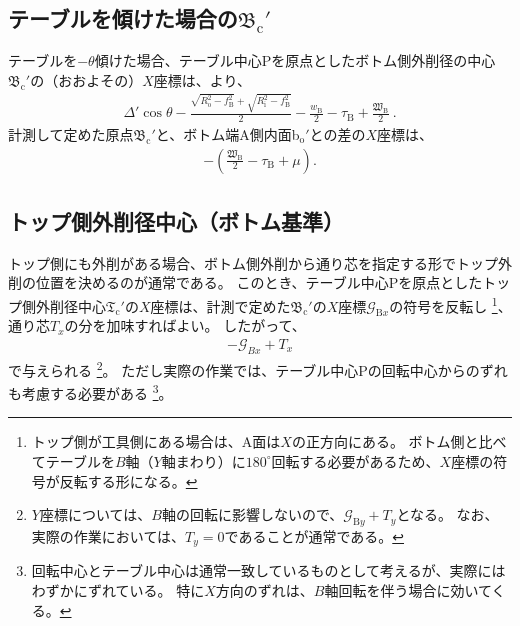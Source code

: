 \subsection[テーブルを傾けた場合の\texorpdfstring{$\mathfrak B_\mathrm c'$}{Bc'}]
           {テーブルを傾けた場合の$\boldsymbol{\mathfrak B_\mathrm c'}$}
テーブルを$-\theta$傾けた場合、テーブル中心Pを原点としたボトム側外削径の中心$\mathfrak B_\mathrm c'$の（おおよその）$X$座標は、より、
\begin{align*}
  \varDelta'\cos\theta-\frac{\sqrt{R_\mathrm o^2-f_\mathrm B^2}+\sqrt{R_\mathrm i^2-f_\mathrm B^2}}2
  -\frac{w_\mathrm B}2-\tau_\mathrm B+\frac{\mathfrak W_\mathrm B}2\ .
\end{align*}
計測して定めた原点$\mathfrak B_\mathrm c'$と、ボトム端A側内面b$_\mathrm o'$との差の$X$座標は、
\begin{align*}
  -\left(\frac{\mathfrak W_\mathrm B}2-\tau_\mathrm B+\mu\right).
\end{align*}


\subsection{トップ側外削径中心（ボトム基準）}
トップ側にも外削がある場合、ボトム側外削から通り芯を指定する形でトップ外削の位置を決めるのが通常である。
このとき、テーブル中心Pを原点としたトップ側外削径中心$\mathfrak T_\mathrm c'$の$X$座標は、計測で定めた$\mathfrak B_\mathrm c'$の$X$座標$\mathcal G_{\mathrm Bx}$の符号を反転し
\footnote{トップ側が工具側にある場合は、A面は$X$の正方向にある。
ボトム側と比べてテーブルを$B$軸（$Y$軸まわり）に$180^\circ$回転する必要があるため、$X$座標の符号が反転する形になる。}、
通り芯$T_x$の分を加味すればよい。
したがって、
\begin{align*}
  -\mathcal G_{Bx}+T_x
\end{align*}
で与えられる
\footnote{$Y$座標については、$B$軸の回転に影響しないので、$\mathcal G_{\mathrm By}+T_y$となる。
なお、実際の作業においては、$T_y = 0$であることが通常である。}。
ただし実際の作業では、テーブル中心Pの回転中心からのずれも考慮する必要がある
\footnote{回転中心とテーブル中心は通常一致しているものとして考えるが、実際にはわずかにずれている。
特に$X$方向のずれは、$B$軸回転を伴う場合に効いてくる。}。




